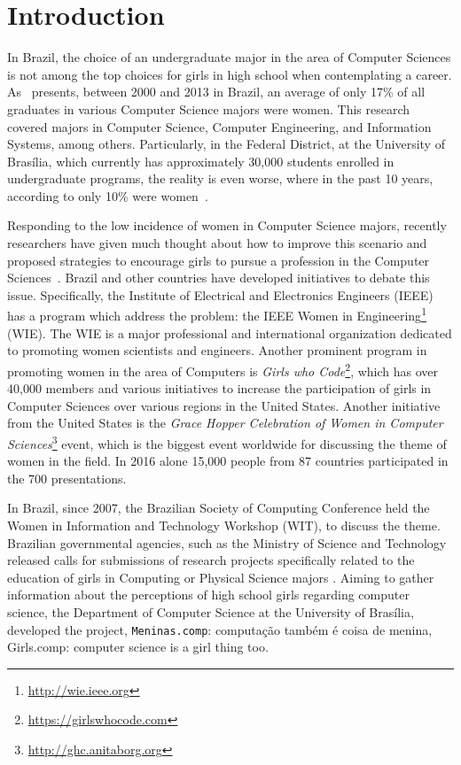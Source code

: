 \section{Introduction}\label{sec:intro}%

In Brazil, the choice of an undergraduate major in the area of Computer Sciences is not among the top choices for girls in high school when contemplating a career. As~\cite{maia_2016} presents, between 2000 and 2013 in Brazil, an average of only 17\% of all graduates in various Computer Science majors were women. This research covered majors in Computer Science, Computer Engineering, and Information Systems, among others. Particularly, in the Federal District, at the University of Brasília, which currently has approximately 30,000 students enrolled in undergraduate programs, the reality is even worse, where in the past 10 years, according to only 10\% were women~\cite{couto_2014}.

Responding to the low incidence of women in Computer Science majors, recently researchers have given much thought about how to improve this scenario and proposed strategies to encourage girls to pursue a profession in the Computer Sciences~\cite{cohoon_2002,couto_2014,gurer_2002,maia_2016}. Brazil and other countries have developed initiatives to debate this issue. Specifically, the Institute of Electrical and Electronics Engineers (IEEE) has a program which address the problem: the IEEE Women in Engineering\footnote{\url{http://wie.ieee.org}} (WIE). The WIE is a major professional and international organization dedicated to promoting women scientists and engineers. Another prominent program in promoting women in the area of Computers is \emph{Girls who Code}\footnote{\url{https://girlswhocode.com}}, which has over 40,000 members and various initiatives to increase the participation of girls in Computer Sciences over various regions in the United States. Another initiative from the United States is the \emph{Grace Hopper Celebration of Women in Computer Sciences}\footnote{\url{http://ghc.anitaborg.org}} event, which is the biggest event worldwide for discussing the theme of women in the field. In 2016 alone 15,000 people from 87 countries participated in the 700 presentations.

In Brazil, since 2007, the Brazilian Society of Computing Conference held the Women in Information and Technology Workshop (WIT), to discuss the theme. Brazilian governmental agencies, such as the Ministry of Science and Technology released calls for submissions of research projects specifically related to the education of girls in Computing or Physical Science majors \cite{cnpq_2017}. Aiming to gather information about the perceptions of high school girls regarding computer science, the Department of Computer Science at the University of Brasília, developed the project, \texttt{Meninas.comp}: computação  também é coisa de menina, Girls.comp: computer science is a girl thing too.

